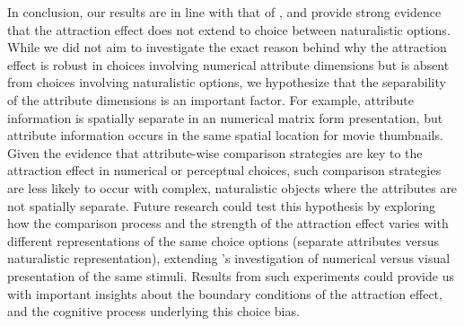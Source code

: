 \documentclass[12pt, a4paper]{article}
\begin{document}
In conclusion, our results are in line with that of , and provide strong evidence that the attraction effect does not extend to choice between naturalistic options. While we did not aim to investigate the exact reason behind why the attraction effect is robust in choices involving numerical attribute dimensions but is absent from choices involving naturalistic options, we hypothesize that the separability of the attribute dimensions is an important factor. For example, attribute information is spatially separate in an numerical matrix form presentation, but attribute information occurs in the same spatial location for movie thumbnails. Given the evidence that attribute-wise comparison strategies are key to the attraction effect in numerical or perceptual choices, such comparison strategies are less likely to occur with complex, naturalistic objects where the attributes are not spatially separate. Future research could test this hypothesis by exploring how the comparison process and the strength of the attraction effect varies with different representations of the same choice options (separate attributes versus naturalistic representation), extending \citeauthor{Frederick2014}'s investigation of numerical versus visual presentation of the same stimuli. Results from such experiments could provide us with important insights about the boundary conditions of the attraction effect, and the cognitive process underlying this choice bias.









\newpage


\end{document}
